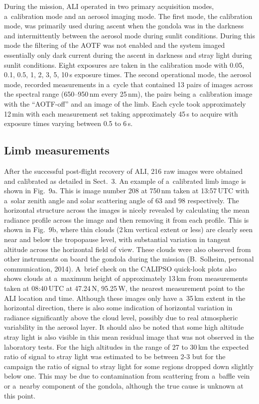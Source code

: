 \documentclass[amtd, online, hvmath]{copernicus}
\begin{document}
During the mission, ALI operated in two primary acquisition modes,
a~calibration mode and an aerosol imaging mode. The first mode, the
calibration mode, was primarily used during ascent when the gondola
was in the darkness and intermittently between the aerosol mode during
sunlit conditions. During this mode the filtering of the AOTF was not
enabled and the system imaged essentially only dark current during the
ascent in darkness and stray light during sunlit conditions. Eight
exposures are taken in the calibration mode with 0.05, 0.1, 0.5, 1, 2,
3, 5, 10\,s exposure times. The second operational mode, the aerosol
mode, recorded measurements in a~cycle that contained 13 pairs of
images across the spectral range (650--950\,\unit{nm} every
25\,\unit{nm}), the pairs being a~calibration image with the
``AOTF-off'' and an image of the limb. Each cycle took approximately
12\,min with each measurement set taking approximately 45\,s to
acquire with exposure times varying between 0.5 to 6\,s.

\subsection{Limb measurements}

After the successful post-flight recovery of ALI, 216 raw images were
obtained and calibrated as detailed in Sect.~3. An example of a~calibrated
limb image is shown in Fig.~9a. This is image number 208 at 750\,\unit{nm}
taken at 13:57\,UTC with a~solar zenith angle and solar scattering angle of
63 and 98{\degree} respectively. The horizontal structure across the images
is nicely revealed by calculating the mean radiance profile across the image
and then removing it from each profile. This is shown in Fig.~9b, where thin
clouds (2\,\unit{km} vertical extent or less) are clearly seen near and below
the tropopause level, with substantial variation in tangent altitude across
the horizontal field of view. These clouds were also observed from other
instruments on board the gondola during the mission (B.~Solheim, personal
communication, 2014). A~brief check on the CALIPSO quick-look plots also
shows clouds at a~maximum height of approximately 13\,\unit{km} from
measurements taken at 08:40\,UTC at 47.24{\degree}\,N, 95.25{\degree}\,W, the
nearest measurement point to the ALI location and time. Although these images
only have a~35\,\unit{km} extent in the horizontal direction, there is also
some indication of horizontal variation in radiance significantly above the
cloud level, possibly due to real atmospheric variability in the aerosol
layer. It should also be noted that some high altitude stray light is also
visible in this mean residual image that was not observed in the laboratory
tests. For the high altitudes in the range of 27 to 30\,km the expected ratio of signal to stray light was estimated to be between 2-3 but for the campaign the ratio of signal to stray light for some regions dropped down slightly below one. This may be due to contamination from scattering from a~baffle vein or
a~nearby component of the gondola, although the true cause is unknown at this
point.
\end{document}
